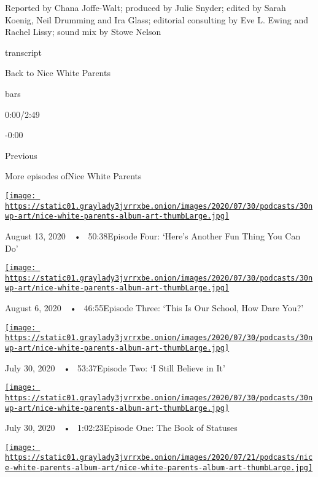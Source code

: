 Reported by Chana Joffe-Walt; produced by Julie Snyder; edited by Sarah
Koenig, Neil Drumming and Ira Glass; editorial consulting by Eve L.
Ewing and Rachel Lissy; sound mix by Stowe Nelson

transcript

Back to Nice White Parents

bars

0:00/2:49

-0:00

Previous

More episodes ofNice White Parents

\href{https://www.nytimes3xbfgragh.onion/2020/08/13/podcasts/nice-white-parents-school.html?action=click\&module=audio-series-bar\&region=header\&pgtype=Article}{\texttt{[image: https://static01.graylady3jvrrxbe.onion/images/2020/07/30/podcasts/30nwp-art/nice-white-parents-album-art-thumbLarge.jpg]}}

August 13, 2020~~•~ 50:38Episode Four: `Here's Another Fun Thing You Can
Do'

\href{https://www.nytimes3xbfgragh.onion/2020/08/06/podcasts/episode-three-this-is-our-school-how-dare-you.html?action=click\&module=audio-series-bar\&region=header\&pgtype=Article}{\texttt{[image: https://static01.graylady3jvrrxbe.onion/images/2020/07/30/podcasts/30nwp-art/nice-white-parents-album-art-thumbLarge.jpg]}}

August 6, 2020~~•~ 46:55Episode Three: `This Is Our School, How Dare
You?'

\href{https://www.nytimes3xbfgragh.onion/2020/07/30/podcasts/nice-white-parents-serial-2.html?action=click\&module=audio-series-bar\&region=header\&pgtype=Article}{\texttt{[image: https://static01.graylady3jvrrxbe.onion/images/2020/07/30/podcasts/30nwp-art/nice-white-parents-album-art-thumbLarge.jpg]}}

July 30, 2020~~•~ 53:37Episode Two: `I Still Believe in It'

\href{https://www.nytimes3xbfgragh.onion/2020/07/30/podcasts/nice-white-parents-serial.html?action=click\&module=audio-series-bar\&region=header\&pgtype=Article}{\texttt{[image: https://static01.graylady3jvrrxbe.onion/images/2020/07/30/podcasts/30nwp-art/nice-white-parents-album-art-thumbLarge.jpg]}}

July 30, 2020~~•~ 1:02:23Episode One: The Book of Statuses

\href{https://www.nytimes3xbfgragh.onion/2020/07/23/podcasts/nice-white-parents-serial.html?action=click\&module=audio-series-bar\&region=header\&pgtype=Article}{\texttt{[image: https://static01.graylady3jvrrxbe.onion/images/2020/07/21/podcasts/nice-white-parents-album-art/nice-white-parents-album-art-thumbLarge.jpg]}}


